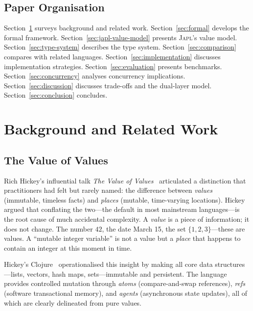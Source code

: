 \documentclass[11pt]{article}
\theoremstyle{definition}
\theoremstyle{remark}
\newcommand{\japl}{\textsc{Japl}}
\begin{document}
\subsection{Paper Organisation}

Section~\ref{sec:background} surveys background and related work.
Section~\ref{sec:formal} develops the formal framework.
Section~\ref{sec:japl-value-model} presents \japl{}'s value model.
Section~\ref{sec:type-system} describes the type system.
Section~\ref{sec:comparison} compares with related languages.
Section~\ref{sec:implementation} discusses implementation strategies.
Section~\ref{sec:evaluation} presents benchmarks.
Section~\ref{sec:concurrency} analyses concurrency implications.
Section~\ref{sec:discussion} discusses trade-offs and the dual-layer
model.  Section~\ref{sec:conclusion} concludes.


\section{Background and Related Work}
\label{sec:background}

\subsection{The Value of Values}

Rich Hickey's influential talk \emph{The Value of Values}~\cite{hickey2012value}
articulated a distinction that practitioners had felt but rarely named:
the difference between \emph{values} (immutable, timeless facts) and
\emph{places} (mutable, time-varying locations).  Hickey argued that
conflating the two---the default in most mainstream languages---is the
root cause of much accidental complexity.  A \emph{value} is a piece
of information; it does not change.  The number $42$, the date March 15,
the set $\{1,2,3\}$---these are values.  A ``mutable integer variable''
is not a value but a \emph{place} that happens to contain an integer
at this moment in time.

Hickey's Clojure~\cite{hickey2008clojure} operationalised this insight
by making all core data structures---lists, vectors, hash maps,
sets---immutable and persistent.  The language provides controlled
mutation through \emph{atoms} (compare-and-swap references),
\emph{refs} (software transactional memory), and \emph{agents}
(asynchronous state updates), all of which are clearly delineated from
pure values.
\end{document}
